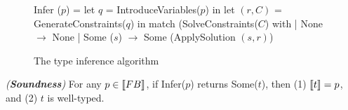 \begin{figure}
\begin{numcodeml}
Infer ($p$) =
  let $q$ = IntroduceVariables($p$) in
  let $(r,C)$ = GenerateConstraints($q$) in
  match (SolveConstraints($C$) with
  | None $\longrightarrow$ None
  | Some ($s$) $\longrightarrow$ Some (ApplySolution $(s,r)$)
\end{numcodeml}

\caption{The type inference algorithm}
\label{fig:type-inference-algo}
\end{figure}

\begin{theorem}
\emph{(\textbf{Soundness})}
For any $p \in \llbracket {\sc FB} \rrbracket$, if Infer($p$) returns Some($t$), then
(1) $\llbracket t \rrbracket = p$, and
(2) $t$ is well-typed.
\end{theorem}





